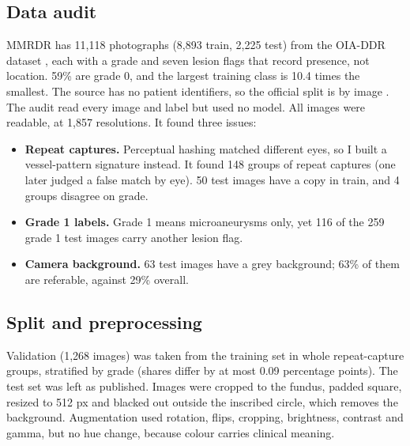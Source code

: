 \documentclass[11pt,a4paper]{article}
\begin{document}
\subsection{Data audit}
MMRDR has 11,118 photographs (8,893 train, 2,225 test) from the OIA-DDR dataset \cite{ddr2019}, each with a grade and seven lesion flags that record presence, not location. 59\% are grade 0, and the largest training class is 10.4 times the smallest. The source has no patient identifiers, so the official split is by image \cite{mmrdr2026}. The audit read every image and label but used no model. All images were readable, at 1,857 resolutions. It found three issues:
\begin{itemize}
  \item \textbf{Repeat captures.} Perceptual hashing matched different eyes, so I built a vessel-pattern signature instead. It found 148 groups of repeat captures (one later judged a false match by eye). 50 test images have a copy in train, and 4 groups disagree on grade.
  \item \textbf{Grade 1 labels.} Grade 1 means microaneurysms only, yet 116 of the 259 grade 1 test images carry another lesion flag.
  \item \textbf{Camera background.} 63 test images have a grey background; 63\% of them are referable, against 29\% overall.
\end{itemize}

\subsection{Split and preprocessing}
Validation (1,268 images) was taken from the training set in whole repeat-capture groups, stratified by grade (shares differ by at most 0.09 percentage points). The test set was left as published. Images were cropped to the fundus, padded square, resized to 512 px and blacked out outside the inscribed circle, which removes the background. Augmentation used rotation, flips, cropping, brightness, contrast and gamma, but no hue change, because colour carries clinical meaning.
\end{document}
